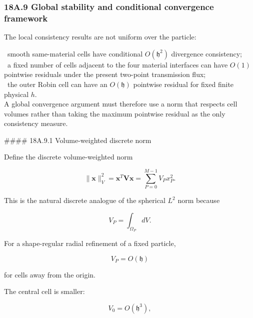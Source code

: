 \documentclass[11pt,a4paper]{article}
\begin{document}
\subsubsection*{18A.9 Global stability and conditional convergence framework}

The local consistency results are not uniform over the particle:

\noindent\textbullet\ smooth same-material cells have conditional $O(\mathfrak h^2)$ divergence consistency;\\
\noindent\textbullet\ a fixed number of cells adjacent to the four material interfaces can have $O(1)$ pointwise residuals under the present two-point transmission flux;\\
\noindent\textbullet\ the outer Robin cell can have an $O(\mathfrak h)$ pointwise residual for fixed finite physical $h$.\\

A global convergence argument must therefore use a norm that respects cell volumes rather than taking the maximum pointwise residual as the only consistency measure.

\#\#\#\# 18A.9.1 Volume-weighted discrete norm

Define the discrete volume-weighted norm

\begin{equation}
\boxed{
\|\mathbf x\|_V^2
=
\mathbf x^T\mathbf V\mathbf x
=
\sum_{P=0}^{M-1}
V_Px_P^2.
}
\tag{TRISO-ACC-263}
\label{eq:triso-acc-263}
\end{equation}

This is the natural discrete analogue of the spherical $L^2$ norm because

\begin{equation}
V_P
=
\int_{\Omega_P}dV.
\tag{TRISO-ACC-264}
\label{eq:triso-acc-264}
\end{equation}

For a shape-regular radial refinement of a fixed particle,

\begin{equation}
V_P=O(\mathfrak h)
\tag{TRISO-ACC-265}
\label{eq:triso-acc-265}
\end{equation}

for cells away from the origin.

The central cell is smaller:

\begin{equation}
V_0=O(\mathfrak h^3),
\tag{TRISO-ACC-266}
\label{eq:triso-acc-266}
\end{equation}
\end{document}

